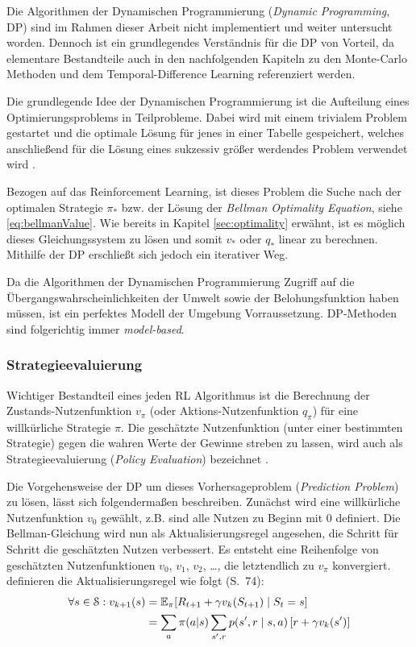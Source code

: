 Die Algorithmen der Dynamischen Programmierung (\textit{Dynamic Programming}, DP) sind im Rahmen dieser Arbeit nicht implementiert und weiter untersucht worden. Dennoch ist ein grundlegendes Verständnis für die DP von Vorteil, da elementare Bestandteile auch in den nachfolgenden Kapiteln zu den Monte-Carlo Methoden und dem Temporal-Difference Learning referenziert werden.
\par 
Die grundlegende Idee der Dynamischen Programmierung ist die Aufteilung eines Optimierungsproblems in Teilprobleme. Dabei wird mit einem trivialem Problem gestartet und die optimale Lösung für jenes in einer Tabelle gespeichert, welches anschließend für die Lösung eines sukzessiv größer werdendes Problem verwendet wird \cite[S.~243]{mehlhorn}.
\par 
Bezogen auf das Reinforcement Learning, ist dieses Problem die Suche nach der optimalen Strategie $\pi_*$ bzw. der Lösung der \textit{Bellman Optimality Equation}, siehe \ref{eq:bellmanValue}. Wie bereits in Kapitel \ref{sec:optimality} erwähnt, ist es möglich dieses Gleichungssystem zu lösen und somit $v_*$ oder $q_*$ linear zu berechnen. Mithilfe der DP erschließt sich jedoch ein iterativer Weg.
\par 
Da die Algorithmen der Dynamischen Programmierung Zugriff auf die Übergangswahrscheinlichkeiten der Umwelt sowie der Belohungsfunktion haben müssen, ist ein perfektes Modell der Umgebung Vorraussetzung. DP-Methoden sind folgerichtig immer \textit{model-based}.
\par

\subsubsection{Strategieevaluierung}
Wichtiger Bestandteil eines jeden RL Algorithmus ist die Berechnung der Zustands-Nutzenfunktion $v_\pi$ (oder Aktions-Nutzenfunktion $q_\pi$) für eine willkürliche Strategie $\pi$. Die geschätzte Nutzenfunktion (unter einer bestimmten Strategie) gegen die wahren Werte der Gewinne streben zu lassen, wird auch als Strategieevaluierung (\textit{Policy Evaluation}) bezeichnet \cite[S.~74]{Sutton1998}.
\par 
Die Vorgehensweise der DP um dieses Vorhersageproblem (\textit{Prediction Problem}) zu lösen, lässt sich folgendermaßen beschreiben. Zunächst wird eine willkürliche Nutzenfunktion $v_0$ gewählt, z.B. sind alle Nutzen zu Beginn mit 0 definiert. Die Bellman-Gleichung wird nun als Aktualisierungsregel angesehen, die Schritt für Schritt die geschätzten Nutzen verbessert. Es entsteht eine Reihenfolge von geschätzten Nutzenfunktionen $v_0$, $v_1$, $v_2$, \dots, die letztendlich zu $v_\pi$ konvergiert. \cite{Sutton1998} definieren die Aktualisierungsregel wie folgt (S.~74):
\begin{equation}\label{eq:fullbackup}
    \begin{aligned}
        \forall s \in \mathcal{S}: v_{k+1}(s) &= \operatorname{\mathbb{E}}_{\pi}[ R_{t+1} + \gamma v_k(S_{t+1}) \mid S_t = s] \\
        &= \sum_a{\pi(a|s) \sum_{s',r}p(s',r\mid s, a) \left[r+\gamma v_k(s')\right]}
    \end{aligned}
\end{equation}

